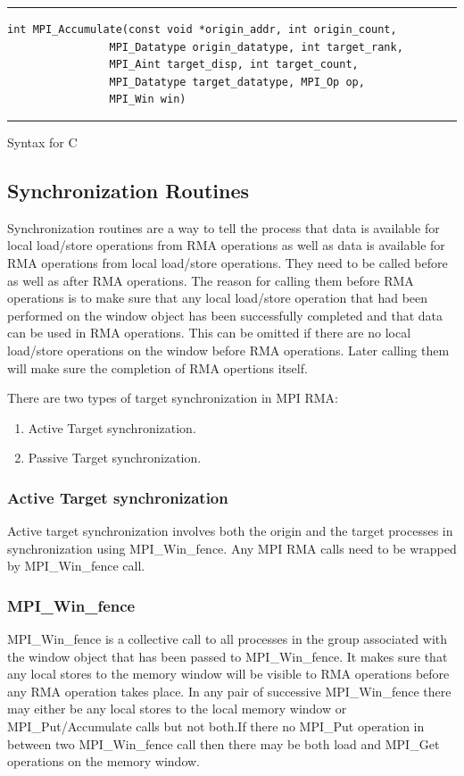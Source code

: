 \begin{listing}[!ht]
\hrule \vspace{5pt}
    \begin{verbatim}
int MPI_Accumulate(const void *origin_addr, int origin_count,
                MPI_Datatype origin_datatype, int target_rank,
                MPI_Aint target_disp, int target_count,
                MPI_Datatype target_datatype, MPI_Op op,
                MPI_Win win)
    \end{verbatim}
\hrule
    \caption{Syntax for C}
\end{listing}

\subsection{Synchronization Routines}
Synchronization routines are a way to tell the process that data is available for local load/store operations from RMA operations as well as data is available for RMA operations from local load/store operations. They need to be called before as well as after RMA operations. The reason for calling them before RMA operations is to make sure that any local load/store operation that had been performed on the window object has been successfully completed and that data can be used in RMA operations. This can be omitted if there are no local load/store operations on the window before RMA operations. Later calling them will make sure the completion of RMA opertions itself.

There are two types of target synchronization in MPI RMA:
\begin{enumerate}
    \item Active Target synchronization.
    \item Passive Target synchronization.
\end{enumerate}

\subsubsection{\large Active Target synchronization} 
Active target synchronization involves both the origin and the target processes in synchronization using {\ttfamily MPI\_Win\_fence}. Any MPI RMA calls need to be wrapped by {\ttfamily MPI\_Win\_fence} call.

\subsubsection{\textbf{MPI\_Win\_fence}}
{\ttfamily MPI\_Win\_fence} is a collective call to all processes in the group associated with the window object that has been passed to {\ttfamily MPI\_Win\_fence}. It makes sure that any local stores to the memory window will be visible to RMA operations before any RMA operation takes place. In any pair of successive {\ttfamily MPI\_Win\_fence} there may either be any local stores to the local memory window or {\ttfamily  MPI\_Put/Accumulate} calls but not both.If there no {\ttfamily MPI\_Put} operation in between two {\ttfamily MPI\_Win\_fence} call then there may be both load and {\ttfamily MPI\_Get} operations on the memory window. 

